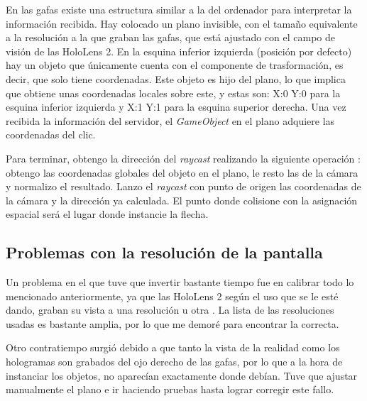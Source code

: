 En las gafas existe una estructura similar a la del ordenador para interpretar la información recibida. Hay colocado un  plano invisible, con el tamaño equivalente a la resolución a la que graban las gafas, que está ajustado con el campo de visión de las HoloLens 2. En la esquina inferior izquierda (posición por defecto) hay un objeto que únicamente cuenta con el componente de trasformación, es decir, que solo tiene coordenadas. Este objeto es hijo del plano, lo que implica que obtiene unas coordenadas locales sobre este, y estas son: X:0 Y:0 para la esquina inferior izquierda y X:1 Y:1 para la esquina superior derecha. Una vez recibida la información del servidor, el \textit{GameObject} en el plano adquiere las coordenadas del clic.

Para terminar, obtengo la dirección del \textit{raycast} realizando la siguiente operación \cite{calculos:vectoriales}: obtengo las coordenadas globales del objeto en el plano, le resto las de la cámara y normalizo el resultado. 
Lanzo el \textit{raycast} con punto de origen las coordenadas de la cámara y la dirección ya calculada. El punto donde colisione con la asignación espacial será el lugar donde instancie la flecha.


\subsection{Problemas con la resolución de la pantalla}

Un problema en el que tuve que invertir bastante tiempo fue en calibrar todo lo mencionado anteriormente, ya que las HoloLens 2 según el uso que se le esté dando, graban su vista a una resolución u otra \cite{microsoft:resoluciones}. La lista de las resoluciones usadas es bastante amplia, por lo que me demoré para encontrar la correcta.

Otro contratiempo surgió debido a que tanto la vista de la realidad como los hologramas son grabados del ojo derecho de las gafas, por lo que a la hora de instanciar los objetos, no aparecían exactamente donde debían. Tuve que ajustar manualmente el plano e ir haciendo pruebas hasta lograr corregir este fallo.

